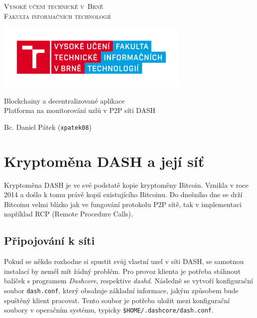 \documentclass[12pt]{article}
\begin{document}
\begin{titlepage}
    \begin{center}
        \Huge
        \textsc{Vysoké učení technické v~Brně} \\
        \huge
        \textsc{Fakulta informačních technologií} \\
       
        	\includegraphics[width=0.7\textwidth]{img/logo.png}
        
        \Huge 
        Blockchainy a decentralizované aplikace \\
        \huge \smaller
        Platforma na monitorování uzlů v P2P síti DASH \\
    \end{center}
    \Large
    \null \hfill Bc. Daniel Pátek (\texttt{xpatek08}) \\
\end{titlepage}

\section{Kryptoměna DASH a její síť}
Kryptoměna DASH je ve své podstatě kopie kryptoměny Bitcoin. Vznikla v roce 2014 a došlo k tomu právě kopií existujícího Bitcoinu. Do dnešního dne se drží Bitcoinu velmi blízko jak ve fungování protokolu P2P sítě, tak v implementaci například RCP (Remote Procedure Calls). \cite{DashWiki}

\subsection{Připojování k síti}
Pokud se někdo rozhodne si spustit svůj vlastní uzel v síti DASH, se samotnou instalací by neměl mít žádný problém. Pro provoz klienta je potřeba stáhnout balíček s programem \textit{Dashcore}, respektive \textit{dashd}. \cite{Dashcore} Následně se vytvoří konfigurační soubor \texttt{dash.conf}, který obsahuje základní informace, jakým způsobem bude spuštěný klient pracovat. \cite{DashConf} Tento soubor je potřeba uložit mezi konfigurační soubory v operačním systému, typicky \texttt{\$HOME/.dashcore/dash.conf}.
\end{document}
